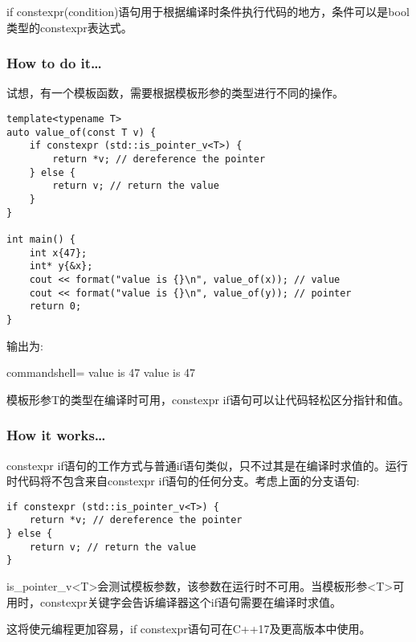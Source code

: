 
if constexpr(condition)语句用于根据编译时条件执行代码的地方，条件可以是bool类型的constexpr表达式。

\subsubsection{How to do it…}

试想，有一个模板函数，需要根据模板形参的类型进行不同的操作。

\begin{lstlisting}[style=styleCXX]
template<typename T>
auto value_of(const T v) {
	if constexpr (std::is_pointer_v<T>) {
		return *v; // dereference the pointer
	} else {
		return v; // return the value
	}
}

int main() {
	int x{47};
	int* y{&x};
	cout << format("value is {}\n", value_of(x)); // value
	cout << format("value is {}\n", value_of(y)); // pointer
	return 0;
}
\end{lstlisting}

输出为:

\begin{tcblisting}{commandshell={}}
value is 47
value is 47
\end{tcblisting}

模板形参T的类型在编译时可用，constexpr if语句可以让代码轻松区分指针和值。

\subsubsection{How it works…}

constexpr if语句的工作方式与普通if语句类似，只不过其是在编译时求值的。运行时代码将不包含来自constexpr if语句的任何分支。考虑上面的分支语句:

\begin{lstlisting}[style=styleCXX]
if constexpr (std::is_pointer_v<T>) {
	return *v; // dereference the pointer
} else {
	return v; // return the value
}
\end{lstlisting}

is\_pointer\_v<T>会测试模板参数，该参数在运行时不可用。当模板形参<T>可用时，constexpr关键字会告诉编译器这个if语句需要在编译时求值。

这将使元编程更加容易，if constexpr语句可在C++17及更高版本中使用。












